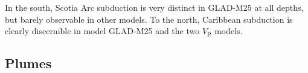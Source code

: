 \documentclass[extra,mreferee]{gji}
\begin{document}
In the south,
Scotia Arc subduction is very distinct in GLAD-M25 at all depths,
but barely observable in other models.
To the north,
Caribbean subduction is clearly discernible in model GLAD-M25 and the two $V_\textrm{P}$ models.

\subsection{Plumes}
\label{section:plumes}

\begin{figure}[ht!]
    \centering
    \\[-1pt]
    \\[-1pt]
    \\[-1pt]
    \\[-1pt]
    \\[-1pt]
    \\

\end{figure}
\end{document}
